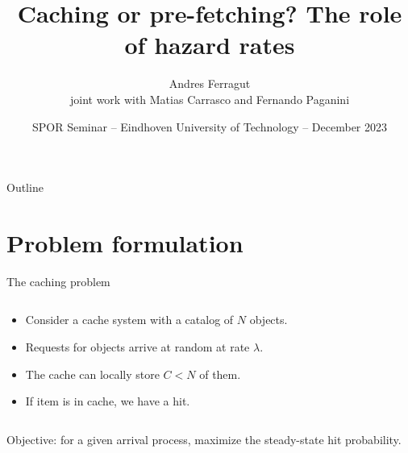 \documentclass[aspectratio=169]{beamer}
\title{Caching or pre-fetching? The role of hazard rates}
\author[Andres Ferragut, Univ. ORT Uruguay]{Andres Ferragut\\[.6em] \normalsize joint work with Matias Carrasco and Fernando Paganini}
\institute{Universidad ORT Uruguay}
\date[SPOR Seminar]{SPOR Seminar -- Eindhoven University of Technology -- December 2023}
\newenvironment*{myitem}[1][1.5em]{\begin{itemize}\setlength{\itemsep}{#1}}{\end{itemize}}
\begin{document}
\frame[plain]{\titlepage}

\begin{frame}{Outline}
\tableofcontents
\end{frame}

\section{Problem formulation}

\begin{frame}{The caching problem}
	
	\begin{columns}
		\begin{column}{0.6\textwidth}
			\begin{myitem}[2em]
				\item Consider a \alert{cache system} with a catalog of $N$ objects.
				\item Requests for objects arrive at random at rate $\lambda$.
				\item The cache can locally store $C<N$ of them.
				\item If item is in cache, we have a \alert{hit}.
			\end{myitem}
		\end{column}
		\begin{column}{0.4\textwidth}
			\centering
			
		\end{column}
	\end{columns}

	\vfill

	\centering
	\alert{Objective:} for a given arrival process, maximize the steady-state hit probability.
\end{frame}

	

\end{document}
